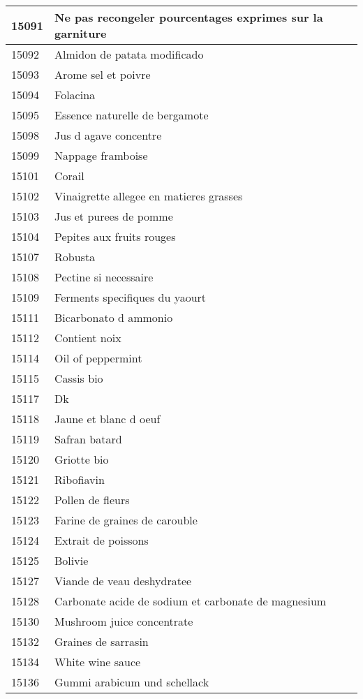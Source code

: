 \begin{longtable}{|l|l|}
15091 & Ne pas recongeler pourcentages exprimes sur la garniture \\ \hline 
15092 & Almidon de patata modificado \\ \hline 
15093 & Arome sel et poivre \\ \hline 
15094 & Folacina \\ \hline 
15095 & Essence naturelle de bergamote \\ \hline 
15098 & Jus d agave concentre \\ \hline 
15099 & Nappage framboise \\ \hline 
15101 & Corail \\ \hline 
15102 & Vinaigrette allegee en matieres grasses \\ \hline 
15103 & Jus et purees de pomme \\ \hline 
15104 & Pepites aux fruits rouges \\ \hline 
15107 & Robusta \\ \hline 
15108 & Pectine si necessaire \\ \hline 
15109 & Ferments specifiques du yaourt \\ \hline 
15111 & Bicarbonato d ammonio \\ \hline 
15112 & Contient noix \\ \hline 
15114 & Oil of peppermint \\ \hline 
15115 & Cassis bio \\ \hline 
15117 & Dk \\ \hline 
15118 & Jaune et blanc d oeuf \\ \hline 
15119 & Safran batard \\ \hline 
15120 & Griotte bio \\ \hline 
15121 & Ribofiavin \\ \hline 
15122 & Pollen de fleurs \\ \hline 
15123 & Farine de graines de carouble \\ \hline 
15124 & Extrait de poissons \\ \hline 
15125 & Bolivie \\ \hline 
15127 & Viande de veau deshydratee \\ \hline 
15128 & Carbonate acide de sodium et carbonate de magnesium \\ \hline 
15130 & Mushroom juice concentrate \\ \hline 
15132 & Graines de sarrasin \\ \hline 
15134 & White wine sauce \\ \hline 
15136 & Gummi arabicum und schellack \\ \hline 

\end{longtable}

